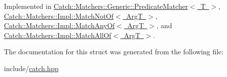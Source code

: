 Implemented in \mbox{\hyperlink{class_catch_1_1_matchers_1_1_generic_1_1_predicate_matcher_a2ec0e8ec19c4c5e26271d59a06a62b52}{Catch\+::\+Matchers\+::\+Generic\+::\+Predicate\+Matcher$<$ T $>$}}, \mbox{\hyperlink{struct_catch_1_1_matchers_1_1_impl_1_1_match_not_of_a181d693c0258e582d80dc6117a1f2b66}{Catch\+::\+Matchers\+::\+Impl\+::\+Match\+Not\+Of$<$ Arg\+T $>$}}, \mbox{\hyperlink{struct_catch_1_1_matchers_1_1_impl_1_1_match_any_of_a8a3e8338f979e56277dcf553efb78dc0}{Catch\+::\+Matchers\+::\+Impl\+::\+Match\+Any\+Of$<$ Arg\+T $>$}}, and \mbox{\hyperlink{struct_catch_1_1_matchers_1_1_impl_1_1_match_all_of_acfb377bda2c58ae62e6df9c3a8a89f8f}{Catch\+::\+Matchers\+::\+Impl\+::\+Match\+All\+Of$<$ Arg\+T $>$}}.



The documentation for this struct was generated from the following file\+:\begin{DoxyCompactItemize}
\item 
include/\mbox{\hyperlink{catch_8hpp}{catch.\+hpp}}\end{DoxyCompactItemize}
